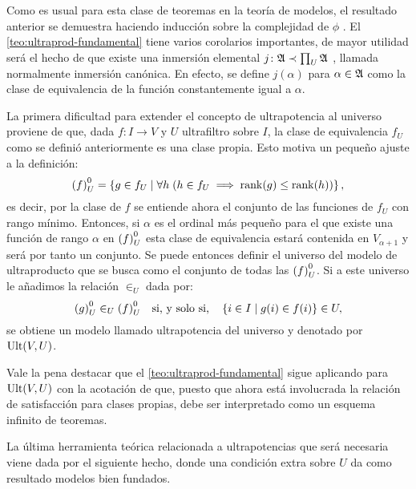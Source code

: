 Como es usual para esta clase de teoremas en la teoría de modelos,
el resultado anterior se demuestra haciendo inducción sobre la complejidad
de $\phi$ \autocite[Teorema 4.1.9]{chang_model_2012}.
El \cref{teo:ultraprod-fundamental} tiene varios corolarios importantes, de mayor
utilidad será el hecho de que existe una inmersión elemental
$j\colon \mathfrak { A }\prec\prod_U\mathfrak { A }$ \autocite[Corolario 4.1.13]{chang_model_2012},
llamada normalmente inmersión canónica.
En efecto, se define $j(\alpha)$
para $\alpha\in\mathfrak { A }$ como la clase de equivalencia de la función constantemente
igual a $\alpha$.

La primera dificultad para extender el concepto de ultrapotencia al universo
proviene de que, dada $f\colon I\to V$ y $U$ ultrafiltro sobre $I$,
la clase de equivalencia $f_U$ como se definió anteriormente es una clase propia.
Esto motiva un pequeño ajuste a la definición:
\[
    {(f)}_U^0 = \left\{ g \in f_U\mid \forall h\; (h\in f_U\implies \operatorname{rank}(g)\leq\operatorname{rank}(h)) \right\},
\]
es decir, por la clase de $f$ se entiende ahora el conjunto de las funciones
de $f_U$ con rango mínimo. Entonces, si $\alpha$ es el ordinal más pequeño para
el que existe una función de rango $\alpha$ en ${(f)}_U^0$ esta clase de equivalencia estará
contenida en $V_{\alpha+1}$ y será por tanto un conjunto. Se puede entonces definir
el universo del modelo de ultraproducto que se busca como el conjunto de todas las ${(f)}_U^0$.
Si a este universo le añadimos la relación $\in_U$ dada por:
\[
    {(g)}_U^0 \in_U {(f)}_U^0
    \quad\text{si, y solo si,}\quad
    \left\{ i\in I\mid g(i)\in f(i) \right\}\in U,
\]
se obtiene un modelo llamado ultrapotencia del universo
y denotado por $\operatorname{Ult}(V,U)$.

Vale la pena destacar que el \cref{teo:ultraprod-fundamental} sigue aplicando para
$\operatorname{Ult}(V,U)$ con la acotación de que, puesto que ahora está involucrada la relación
de satisfacción para clases propias, debe ser interpretado como un esquema infinito de teoremas.

La última herramienta teórica relacionada a ultrapotencias que será necesaria viene
dada por el siguiente hecho, donde una condición extra sobre $U$ da como resultado
modelos bien fundados.

